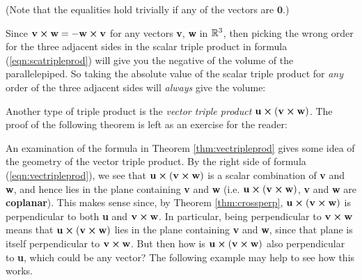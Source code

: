 
\par\noindent(Note that the equalities hold trivially if any of the vectors are $\textbf{0}$.)\vspace{2mm}

Since $\textbf{v} \bm{\times} \textbf{w} = -\textbf{w} \bm{\times} \textbf{v}$ for any vectors \textbf{v}, \textbf{w}
in $\mathbb{R}^{3}$, then picking the wrong order for the three adjacent sides in the scalar triple product in formula
(\ref{eqn:scatripleprod}) will give you the negative of the volume of the parallelepiped. So
taking the absolute value of the scalar triple product for \emph{any} order of the three adjacent sides will
\emph{always} give the volume:


Another type of triple product is the \emph{vector triple product}
$\textbf{u} \bm{\times} (\textbf{v} \bm{\times} \textbf{w})$. The proof of the following theorem is left as an
exercise for the reader:

An examination of the formula in Theorem \ref{thm:vectripleprod} gives some idea of the geometry of the vector triple
product. By the right side of formula (\ref{eqn:vectripleprod}), we see that
$\textbf{u} \bm{\times} (\textbf{v} \bm{\times} \textbf{w})$ is a scalar combination of \textbf{v} and \textbf{w}, and
hence lies in the plane containing \textbf{v} and \textbf{w} (i.e.
$\textbf{u} \bm{\times} (\textbf{v} \bm{\times} \textbf{w})$, \textbf{v} and \textbf{w} are
\textbf{coplanar}).
This makes sense since, by Theorem \ref{thm:crossperp},
$\textbf{u} \bm{\times} (\textbf{v} \bm{\times} \textbf{w})$ is perpendicular to both \textbf{u} and
$\textbf{v} \bm{\times} \textbf{w}$. In particular, being perpendicular to $\textbf{v} \bm{\times} \textbf{w}$ means
that $\textbf{u} \bm{\times} (\textbf{v} \bm{\times} \textbf{w})$ lies in the plane containing \textbf{v} and
\textbf{w}, since that plane is itself perpendicular to $\textbf{v} \bm{\times} \textbf{w}$. But then how is
$\textbf{u} \bm{\times} (\textbf{v} \bm{\times} \textbf{w})$ also perpendicular to \textbf{u}, which could be any
vector? The following example may help to see how this works.

